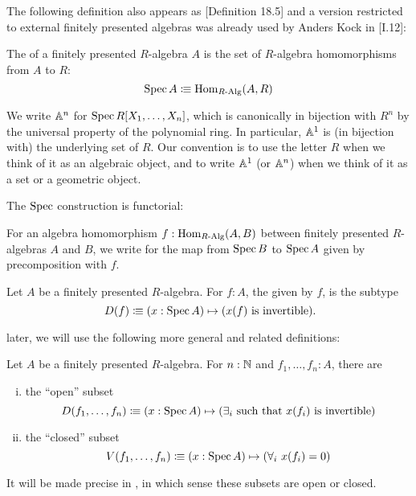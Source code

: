 The following definition also appears as \cite{ingo-thesis}[Definition 18.5]
and a version restricted to external finitely presented algebras was already used by Anders Kock in \cite{kock-sdg}[I.12]:

\begin{definition}
  \label{spec}
  The  of a finitely presented $R$-algebra $A$
  is the set of $R$-algebra homomorphisms from $A$ to $R$:
  \[ \operatorname{Spec} A \vcentcolon\mspace{-1.2mu}\equiv \mathrm{Hom}_{R\text{-}\mathrm{Alg}}(A, R) \]
\end{definition}

We write $\mathbb{A}^n$ for $\operatorname{Spec} R[X_1, \dots, X_n]$,
which is canonically in bijection with $R^n$
by the universal property of the polynomial ring.
In particular,
$\mathbb{A}^1$ is (in bijection with) the underlying set of $R$.
Our convention is to use the letter $R$
when we think of it as an algebraic object,
and to write $\mathbb{A}^1$ (or $\mathbb{A}^n$) when we think of it as a set or a geometric object.

The $\operatorname{Spec}$ construction is functorial:

\begin{definition}
  \label{spec-on-maps}
  For an algebra homomorphism $f:\mathrm{Hom}_{R\text{-}\mathrm{Alg}}(A,B)$
  between finitely presented $R$-algebras $A$ and $B$,
  we write  for the map from $\operatorname{Spec} B$ to $\operatorname{Spec} A$
  given by precomposition with $f$.
\end{definition}

\begin{definition}%
  \label{basic-open-subset}
  Let $A$ be a finitely presented $R$-algebra.
  For $f:A$, the  given by $f$,
  is the subtype 
  \[
    D(f)\colonequiv (x:\Spec A)\mapsto (x(f)\text{ is invertible})
    \rlap{.}
  \]
\end{definition}

later, we will use the following more general and related definitions:

\begin{definition}
  \label{open-closed-affine-subsets}
  Let $A$ be a finitely presented $R$-algebra.
  For $n:\mathbb{N}$ and $f_1,\dots,f_n:A$, there are
  \begin{enumerate}[(i)]
  \item the ``open'' subset
    \[
      D(f_1,\dots,f_n)\vcentcolon\mspace{-1.2mu}\equiv (x:\operatorname{Spec} A)\mapsto (\text{$\exists_i$ such that $x(f_i)$ is invertible})
    \]  
  \item the ``closed'' subset
    \[
      V(f_1,\dots,f_n)\vcentcolon\mspace{-1.2mu}\equiv (x:\operatorname{Spec} A)\mapsto (\forall_i\ x(f_i)=0)
    \]  
  \end{enumerate}
  It will be made precise in , in which sense these subsets are open or closed.
\end{definition}

